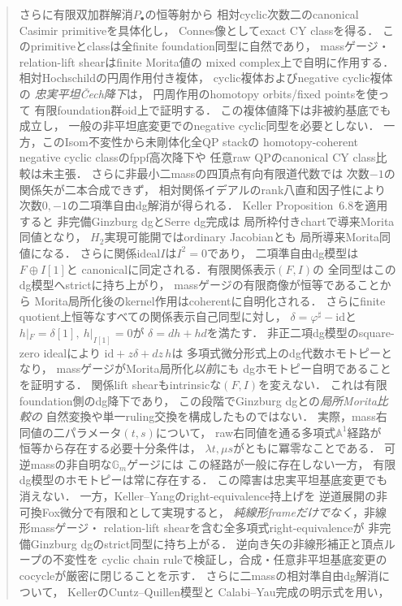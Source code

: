 \documentclass[a4paper,11pt]{ltjsarticle}
\numberwithin{equation}{section}
\theoremstyle{plain}
\theoremstyle{definition}
\theoremstyle{remark}
\newcommand{\Gm}{\mathbb G_m}
\begin{document}
\begin{abstract}
さらに有限双加群解消$P_\bullet$の恒等射から
相対cyclic次数二のcanonical Casimir primitiveを具体化し，
Connes像としてexact CY classを得る．
このprimitiveとclassは全finite foundation同型に自然であり，
massゲージ・relation-lift shearはfinite Morita値の
mixed complex上で自明に作用する．
相対Hochschildの円周作用付き複体，
cyclic複体およびnegative cyclic複体の
\emph{忠実平坦\v{C}ech降下}は，
円周作用のhomotopy orbits/fixed pointsを使って
有限foundation群oid上で証明する．
この複体値降下は非被約基底でも成立し，
一般の非平坦底変更でのnegative cyclic同型を必要としない．
一方，このIsom不変性から未剛体化全QP stackの
homotopy-coherent negative cyclic classのfppf高次降下や
任意raw QPのcanonical CY class比較は未主張．
さらに非最小二massの四頂点有向有限道代数では
次数$-1$の関係矢が二本合成できず，
相対関係イデアルのrank八直和因子性により
次数$0,-1$の二項準自由dg解消が得られる．
Keller Proposition~6.8を適用すると
非完備Ginzburg dgとSerre dg完成は
局所枠付きchartで導来Morita同値となり，
$H_2$実現可能開ではordinary Jacobianとも
局所導来Morita同値になる．
さらに関係ideal$I$は$I^2=0$であり，
二項準自由dg模型は$F\oplus I[1]$と
canonicalに同定される．有限関係表示$(F,I)$の
全同型はこのdg模型へstrictに持ち上がり，
massゲージの有限商像が恒等であることから
Morita局所化後のkernel作用はcoherentに自明化される．
さらにfinite quotient上恒等なすべての関係表示自己同型に対し，
$\delta=\varphi^\sharp-\mathrm{id}$と
$h|_F=\delta[1],\ h|_{I[1]}=0$が
$\delta=dh+hd$を満たす．
非正二項dg模型のsquare-zero idealにより
$\mathrm{id}+z\delta+dz\,h$は
多項式微分形式上のdg代数ホモトピーとなり，
massゲージがMorita局所化\emph{以前}にも
dgホモトピー自明であることを証明する．
関係lift shearもintrinsicな$(F,I)$を変えない．
これは有限foundation側のdg降下であり，
この段階でGinzburg dgとの\emph{局所Morita比較の}
自然変換や単一ruling交換を構成したものではない．
実際，mass右同値の二パラメータ$(t,s)$について，
raw右同値を通る多項式$\mathbb A^1$経路が
恒等から存在する必要十分条件は，
$\lambda t,\mu s$がともに冪零なことである．
可逆massの非自明な$\Gm$ゲージには
この経路が一般に存在しない一方，
有限dg模型のホモトピーは常に存在する．
この障害は忠実平坦基底変更でも消えない．
一方，Keller--Yangのright-equivalence持上げを
逆道展開の非可換Fox微分で有限和として実現すると，
\emph{純線形frameだけでなく}，非線形massゲージ・
relation-lift shearを含む全多項式right-equivalenceが
非完備Ginzburg dgのstrict同型に持ち上がる．
逆向き矢の非線形補正と頂点ループの不変性を
cyclic chain ruleで検証し，合成・任意非平坦基底変更の
cocycleが厳密に閉じることを示す．
さらに二massの相対準自由dg解消について，
KellerのCuntz--Quillen模型と
Calabi--Yau完成の明示式を用い，

\end{abstract}
\end{document}
